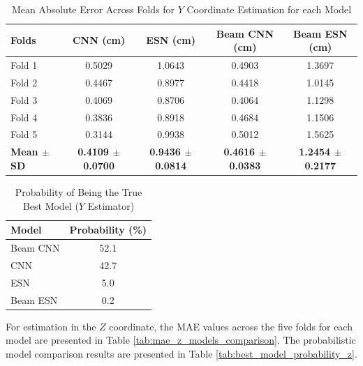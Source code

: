 \begin{table}[H]
  \centering
  \caption{Mean Absolute Error Across Folds for $Y$ Coordinate Estimation for each Model}
  \label{tab:mae_y_models_comparison}
  \vspace{0.25cm}
  \footnotesize
  \begin{tabular}{lcccc}
    \toprule
    \textbf{Folds} & \textbf{CNN (cm)} & \textbf{ESN (cm)} & \textbf{Beam CNN (cm)} & \textbf{Beam ESN (cm)} \\
    \midrule
    Fold 1 & 0.5029 & 1.0643 & 0.4903 & 1.3697 \\
    Fold 2 & 0.4467 & 0.8977 & 0.4418 & 1.0145 \\
    Fold 3 & 0.4069 & 0.8706 & 0.4064 & 1.1298 \\
    Fold 4 & 0.3836 & 0.8918 & 0.4684 & 1.1506 \\
    Fold 5 & 0.3144 & 0.9938 & 0.5012 & 1.5625 \\
    \midrule
    \textbf{Mean $\pm$ SD} & \textbf{0.4109 $\pm$ 0.0700} & \textbf{0.9436 $\pm$ 0.0814} & \textbf{0.4616 $\pm$ 0.0383} & \textbf{1.2454 $\pm$ 0.2177} \\
    \bottomrule
  \end{tabular}
\end{table}


\begin{table}[H]
  \centering
  \caption{Probability of Being the True Best Model ($Y$ Estimator)}
  \label{tab:best_model_probability_y}
  \vspace{0.25cm}
  \begin{tabular}{lc}
    \toprule
    \textbf{Model} & \textbf{Probability (\%)} \\
    \midrule
    Beam CNN & 52.1 \\
    CNN      & 42.7 \\
    ESN      & 5.0  \\
    Beam ESN & 0.2  \\
    \bottomrule
  \end{tabular}
\end{table}


For estimation in the $Z$ coordinate, the MAE values across the five folds for each model are presented in Table \ref{tab:mae_z_models_comparison}. The probabilistic model comparison results are presented in Table \ref{tab:best_model_probability_z}.

